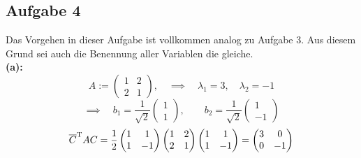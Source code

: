 
	\subsection*{Aufgabe 4} %
	\label{sub:aufgabe_4}
	
		Das Vorgehen in dieser Aufgabe ist vollkommen analog zu Aufgabe 3.
		Aus diesem Grund sei auch die Benennung aller Variablen die gleiche.\\

		\textbf{(a):}
		\[
			A :=
			\begin{pmatrix}
				1 & 2 \\
				2 & 1
			\end{pmatrix}
			,\quad \implies \quad \lambda_1 = 3, \quad \lambda_2 = -1
		\]
		\[
			\implies \quad
			b_1 = \frac{1}{\sqrt{2}}
			\begin{pmatrix}
				1 \\ 1
			\end{pmatrix}
			,\qquad
			b_2 = \frac{1}{\sqrt{2}}
			\begin{pmatrix}
				1 \\ -1
			\end{pmatrix}
		\]
		\[
			{\overline{C}}^{\mathrm{T}}AC = \frac{1}{2}
			\begin{pmatrix}
				1 & 1 \\
				1 & -1
			\end{pmatrix}
			\begin{pmatrix}
				1 & 2 \\
				2 & 1
			\end{pmatrix}
			\begin{pmatrix}
				1 & 1 \\
				1 & -1
			\end{pmatrix}
			=
			\begin{pmatrix}
				3 & 0 \\
				0 & -1 
			\end{pmatrix}
		\]

